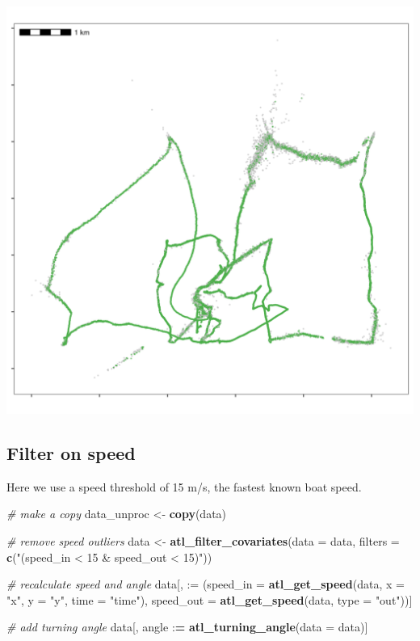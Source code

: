 \documentclass[
]{scrreprt}
\newenvironment{Shaded}{}{}
\newcommand{\CommentTok}[1]{\textcolor[rgb]{0.38,0.63,0.69}{\textit{#1}}}
\newcommand{\DataTypeTok}[1]{\textcolor[rgb]{0.56,0.13,0.00}{#1}}
\newcommand{\ErrorTok}[1]{\textcolor[rgb]{1.00,0.00,0.00}{\textbf{#1}}}
\newcommand{\KeywordTok}[1]{\textcolor[rgb]{0.00,0.44,0.13}{\textbf{#1}}}
\newcommand{\NormalTok}[1]{#1}
\newcommand{\OperatorTok}[1]{\textcolor[rgb]{0.40,0.40,0.40}{#1}}
\newcommand{\StringTok}[1]{\textcolor[rgb]{0.25,0.44,0.63}{#1}}
\begin{document}
\includegraphics{figures/fig_speed_outlier.png}

\hypertarget{filter-on-speed}{%
\subsection{Filter on speed}\label{filter-on-speed}}

Here we use a speed threshold of 15 m/s, the fastest known boat speed.

\begin{Shaded}
\begin{Highlighting}[]
\CommentTok{\# make a copy}
\NormalTok{data\_unproc <{-}}\StringTok{ }\KeywordTok{copy}\NormalTok{(data)}

\CommentTok{\# remove speed outliers}
\NormalTok{data <{-}}\StringTok{ }\KeywordTok{atl\_filter\_covariates}\NormalTok{(}\DataTypeTok{data =}\NormalTok{ data,}
            \DataTypeTok{filters =} \KeywordTok{c}\NormalTok{(}\StringTok{"(speed\_in < 15 \& speed\_out < 15)"}\NormalTok{))}

\CommentTok{\# recalculate speed and angle}
\NormalTok{data[, }\StringTok{\textasciigrave{}}\DataTypeTok{:=}\StringTok{\textasciigrave{}}\NormalTok{ (}\DataTypeTok{speed\_in =} \KeywordTok{atl\_get\_speed}\NormalTok{(data, }
                                      \DataTypeTok{x =} \StringTok{"x"}\NormalTok{, }
                                      \DataTypeTok{y =} \StringTok{"y"}\NormalTok{, }
                                      \DataTypeTok{time =} \StringTok{"time"}\NormalTok{),}
             \DataTypeTok{speed\_out =} \KeywordTok{atl\_get\_speed}\NormalTok{(data, }\DataTypeTok{type =} \StringTok{"out"}\NormalTok{))]}

\CommentTok{\# add turning angle}
\NormalTok{data[, angle }\OperatorTok{:}\ErrorTok{=}\StringTok{ }\KeywordTok{atl\_turning\_angle}\NormalTok{(}\DataTypeTok{data =}\NormalTok{ data)]}
\end{Highlighting}
\end{Shaded}
\end{document}
